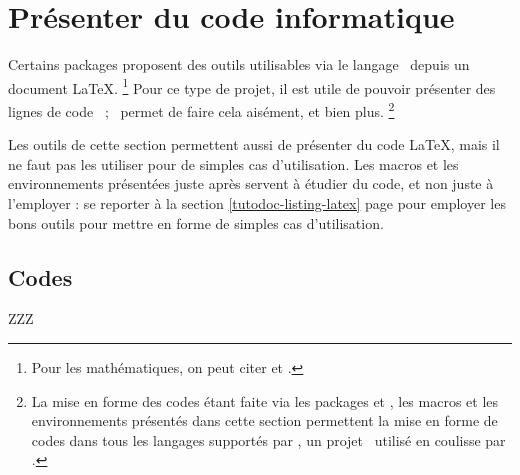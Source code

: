 \documentclass{tutodoc}
\begin{document}
\section{Présenter du code informatique}

Certains packages proposent des outils utilisables via le langage \lua\ depuis un document \LaTeX.%
\footnote{
	Pour les mathématiques, on peut citer  et .
}
Pour ce type de projet, il est utile de pouvoir présenter des lignes de code \lua\ ; \thisproj\ permet de faire cela aisément, et bien plus.%
\footnote{
    La mise en forme des codes étant faite via les packages  et , les macros et les environnements présentés dans cette section permettent la mise en forme de codes dans tous les langages supportés par \pygmentsREF, un projet \python\ utilisé en coulisse par .
}


\begin{tdoccaut}
	Les outils de cette section permettent aussi de présenter du code \LaTeX, mais il ne faut pas les utiliser pour de simples cas d'utilisation.
	Les macros et les environnements présentées juste après servent à étudier du code, et non juste à l'employer : se reporter à la section \ref{tutodoc-listing-latex} page \pageref{tutodoc-listing-latex} pour employer les bons outils pour mettre en forme de simples cas d'utilisation.
\end{tdoccaut}



\subsection{Codes }

ZZZ




\end{document}
